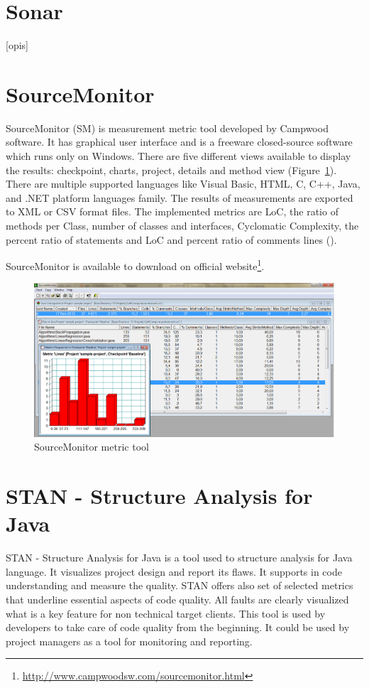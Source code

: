\section{Sonar}
[opis]


\section{SourceMonitor}
SourceMonitor (SM) is measurement metric tool developed by Campwood software. It has graphical user interface and is a freeware closed-source software which runs only on Windows. There are five different views available to display the results: checkpoint, charts, project, details and method view (Figure~\ref{fig:sourcemonitor}). There are multiple supported languages like Visual Basic, HTML, C, C++, Java, and .NET platform languages family. The results of measurements are exported to XML or CSV format files. The implemented metrics are \ac{LoC}, the ratio of methods per Class, number of classes and interfaces, Cyclomatic Complexity, the percent ratio of statements and \ac{LoC} and percent ratio of comments lines (\cite{indie}).

SourceMonitor is available to download on official website\footnote{\url{http://www.campwoodsw.com/sourcemonitor.html}}.

\begin{figure}[h!]
	\centering
	\includegraphics[scale=0.4]{img/sourcemonitor.png} 
	\caption{SourceMonitor metric tool}		
	\label{fig:sourcemonitor}
\end{figure}


\section{STAN - Structure Analysis for Java} 
STAN - Structure Analysis for Java is a tool used to structure analysis for Java language. It visualizes project design and report its flaws. It supports in code understanding and measure the quality. STAN offers also set of selected metrics that underline essential aspects of code quality. All faults are clearly visualized what is a key feature for non technical target clients. This tool is used by developers to take care of code quality from the beginning. It could be used by project managers as a tool for monitoring and reporting. 

